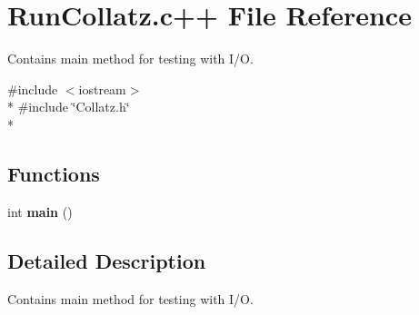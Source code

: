 \hypertarget{RunCollatz_8c_09_09}{\section{Run\-Collatz.\-c++ File Reference}
\label{RunCollatz_8c_09_09}
}


Contains main method for testing with I/\-O.  


{\ttfamily \#include $<$iostream$>$}\\*
{\ttfamily \#include \char`\"{}Collatz.\-h\char`\"{}}\\*
\subsection*{Functions}
\begin{DoxyCompactItemize}
\item 
\hypertarget{RunCollatz_8c_09_09_ae66f6b31b5ad750f1fe042a706a4e3d4}{int {\bfseries main} ()}\label{RunCollatz_8c_09_09_ae66f6b31b5ad750f1fe042a706a4e3d4}

\end{DoxyCompactItemize}


\subsection{Detailed Description}
Contains main method for testing with I/\-O. 